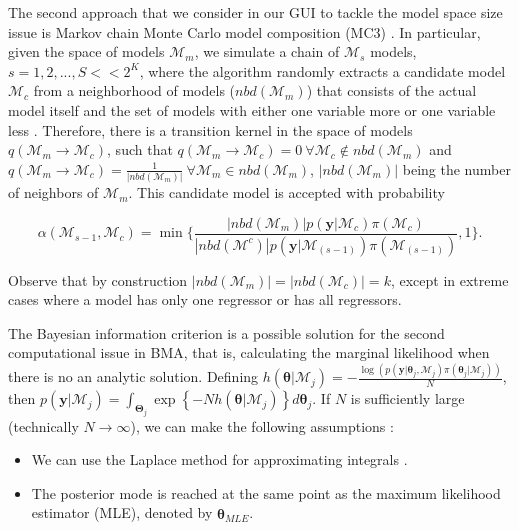 The second approach that we consider in our GUI to tackle the model space size issue is Markov chain Monte Carlo model composition (MC3) \cite{madigan1995bayesian1}.
In particular, given the space of models $\mathcal{M}_m$, we simulate a chain of $\mathcal{M}_s$ models, $s = 1, 2, ..., S<<2^K$, where the algorithm randomly extracts a candidate model $\mathcal{M}_c$ from a neighborhood of models ($nbd(\mathcal{M}_m)$) that consists of the actual model itself and the set of models with either one variable more or one variable less \cite{Raftery1997}. Therefore, there is a transition kernel in the space of models $q(\mathcal{M}_m\rightarrow \mathcal{M}_c)$, such that $q(\mathcal{M}_m\rightarrow \mathcal{M}_{c})=0 \ \forall \mathcal{M}_{c}\notin nbd(\mathcal{M}_m)$ and $q(\mathcal{M}_m\rightarrow \mathcal{M}_{c})=\frac{1}{|nbd(\mathcal{M}_m)|} \ \forall \mathcal{M}_m\in nbd(\mathcal{M}_m)$, $|nbd(\mathcal{M}_m)|$ being the number of neighbors of $\mathcal{M}_m$. This candidate model is accepted with probability

\begin{equation*}
	\alpha (\mathcal{M}_{s-1},\mathcal{M}_{c})=\min \bigg \{ \frac{|nbd(\mathcal{M}_m)|p(\bm{y} | \mathcal{M}_c)\pi(\mathcal{M}_c)}{|nbd(\mathcal{M}^{c})|p(\bm{y}| \mathcal{M}_{(s-1)})\pi(\mathcal{M}_{(s-1)})},1 \bigg \}.
\end{equation*}

Observe that by construction $|nbd(\mathcal{M}_m)|=|nbd(\mathcal{M}_c)|=k$, except in extreme cases where a model has only one regressor or has all regressors.

The Bayesian information criterion is a possible solution for the second computational issue in BMA, that is, calculating the marginal likelihood when there is no an analytic solution. Defining $h(\bm{\theta}|\mathcal{M}_j)=-\frac{\log(p(\bm{y}| \bm{\theta}_j,\mathcal{M}_j)\pi(\bm{\theta}_j | \mathcal{M}_j))}{N}$, then $p(\bm{y} | \mathcal{M}_j)=\int_{\bm{\Theta}_j} \exp\left\{-N h(\bm{\theta}|\mathcal{M}_j)\right\}  d\bm{\theta}_{j}$. If $N$ is sufficiently large (technically $N\to \infty$), we can make the following assumptions \cite{Hoeting1999}:

\begin{itemize}
	\item We can use the Laplace method for approximating integrals \cite{Tierney1986}.
	\item The posterior mode is reached at the same point as the maximum likelihood estimator (MLE), denoted by $\hat{\bm{\theta}}_{MLE}$.
\end{itemize}

